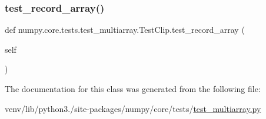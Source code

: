 \subsubsection{\texorpdfstring{test\+\_\+record\+\_\+array()}{test\_record\_array()}}
{\footnotesize\ttfamily def numpy.\+core.\+tests.\+test\+\_\+multiarray.\+Test\+Clip.\+test\+\_\+record\+\_\+array (\begin{DoxyParamCaption}\item[{}]{self }\end{DoxyParamCaption})}



The documentation for this class was generated from the following file\+:\begin{DoxyCompactItemize}
\item 
venv/lib/python3./site-\/packages/numpy/core/tests/\hyperlink{core_2tests_2test__multiarray_8py}{test\+\_\+multiarray.\+py}\end{DoxyCompactItemize}
